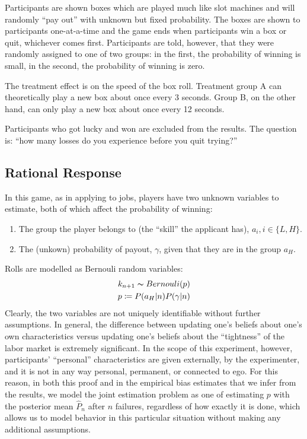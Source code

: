 \documentclass[a4paper,12pt]{article}
\begin{document}
Participants are shown boxes which are played much like slot machines and will randomly ``pay out'' with unknown but fixed probability. The boxes are shown to participants one-at-a-time and the game ends when participants win a box or quit, whichever comes first. Participants are told, however, that they were randomly assigned to one of two groups: in the first, the probability of winning is small, in the second, the probability of winning is zero.

The treatment effect is on the speed of the box roll. Treatment group A can theoretically play a new box about once every 3 seconds. Group B, on the other hand, can only play a new box about once every 12 seconds.

Participants who got lucky and won are excluded from the results. The question is: ``how many losses do you experience before you quit trying?''

\subsection{ Rational Response }

In this game, as in applying to jobs, players have two unknown variables to estimate, both of which affect the probability of winning:

\begin{enumerate}
\item The group the player belongs to (the ``skill'' the applicant has), $a_i, i \in \{L,H\}$.
\item The (unkown) probability of payout, $\gamma$, given that they are in the group $a_H$.
\end{enumerate}
%
Rolls are modelled as Bernouli random variables:
\begin{align*}
k_{n+1} \thicksim Bernouli( p ) \\
p \coloneqq P(a_H | n)P(\gamma | n)
\end{align*}
Clearly, the two variables are not uniquely identifiable without further assumptions. In general, the difference between updating one's beliefs about one's own characteristics versus updating one's beliefs about the ``tightness'' of the labor market is extremely significant. In the scope of this experiment, however, participants' ``personal'' characteristics are given externally, by the experimenter, and it is not in any way personal, permanent, or connected to ego. For this reason, in both this proof and in the empirical bias estimates that we infer from the results, we model the joint estimation problem as one of estimating $p$ with the posterior mean $\hat{P}_n$ after $n$ failures, regardless of how exactly it is done, which allows us to model behavior in this particular situation without making any additional assumptions.
\end{document}
